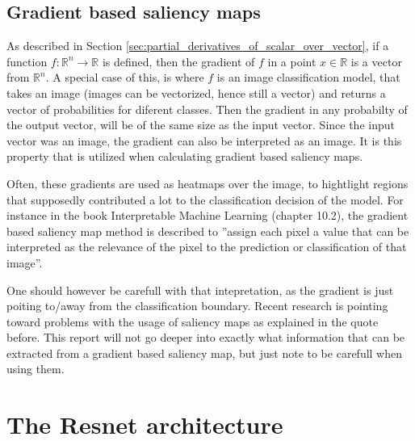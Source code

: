 \subsection{Gradient based saliency maps} \label{sec:gradiant_saliency_maps}
As described in Section \ref{sec:partial_derivatives_of_scalar_over_vector},
if a function $f: \mathbb{R}^n \rightarrow \mathbb{R}$ is defined,
then the gradient of $f$ in a point $x\in\mathbb{R}$ is a vector from $\mathbb{R}^n$.
A special case of this, is where $f$ is an image classification model, that takes
an image (images can be vectorized, hence still a vector) and returns a vector of probabilities for
diferent classes.
Then the gradient in any probabilty of the output vector, will be of the same size as the input vector.
Since the input vector was an image, the gradient can also be interpreted as an image.
It is this property that is utilized when calculating gradient based saliency maps.

Often, these gradients are used as heatmaps over the image, to hightlight regions that 
supposedly contributed a lot to the classification decision of the model. 
For instance in the book Interpretable Machine Learning (chapter 10.2)\cite{interpretable-machine-learning}, the gradient based 
saliency map method is described to
''assign each pixel a value that can be interpreted as the relevance of the pixel to the prediction or classification of that image''.

One should however be carefull with that intepretation, as the gradient is just poiting to/away from the classification boundary.
Recent research is pointing toward problems with the usage of saliency maps as explained in the quote before\cite{false-hope}.
This report will not go deeper into exactly what information that can be extracted from a gradient based saliency map,
but just note to be carefull when using them.

\section{The Resnet architecture}
